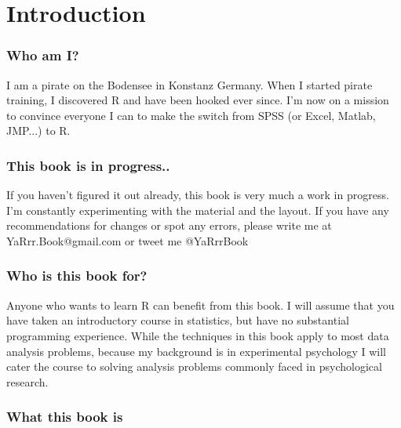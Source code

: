 \documentclass{tufte-book}\usepackage[]{graphicx}\usepackage[]{color}
\begin{document}


\chapter{Introduction} %

\subsection{Who am I?}

I am a pirate on the Bodensee in Konstanz Germany. When I started pirate training, I discovered R and have been hooked ever since. I'm now on a mission to convince everyone I can to make the switch from SPSS (or Excel, Matlab, JMP...) to R.

\subsection{This book is in progress..}

If you haven't figured it out already, this book is very much a work in progress. I'm constantly experimenting with the material and the layout. If you have any recommendations for changes or spot any errors, please write me at YaRrr.Book@gmail.com or tweet me @YaRrrBook


\subsection{Who is this book for?}
Anyone who wants to learn R can benefit from this book. I will assume that you have taken an introductory course in statistics, but have no substantial programming experience. While the techniques in this book apply to most data analysis problems, because my background is in experimental psychology I will cater the course to solving analysis problems commonly faced in psychological research.

\subsection{What this book \textbf{is}}
\end{document}
